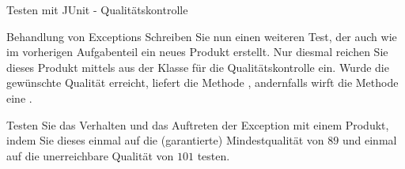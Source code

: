 \documentclass{../tuda-exercise}
\begin{document}
\begin{task}[credit=\stars{2}{3}]{Testen mit JUnit - Qualitätskontrolle}
    \clearpagesolution

    \begin{subtask*}{Behandlung von Exceptions}
      Schreiben Sie nun einen weiteren Test, der auch wie im vorherigen Aufgabenteil ein neues
      Produkt erstellt. Nur diesmal reichen Sie dieses Produkt mittels
       aus der Klasse
       für die Qualitätskontrolle ein. Wurde die gewünschte
      Qualität erreicht, liefert die Methode ,  andernfalls wirft die Methode eine
      .

      \br

      Testen Sie das Verhalten und das Auftreten der Exception mit einem Produkt, indem Sie
      dieses einmal auf die (garantierte) Mindestqualität von \(89\) und einmal auf die
      unerreichbare Qualität von \(101\) testen.

      \begin{solution}
        
      \end{solution}
    \end{subtask*}
  \end{task}

  \clearpage
\end{document}
